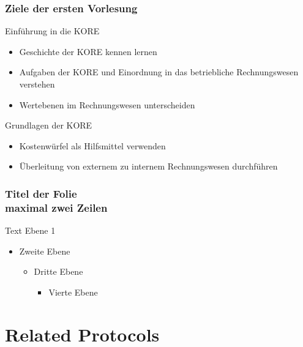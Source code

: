 \documentclass{beamer}
\begin{document}
\begin{frame}


\end{frame}



\begin{frame}
	\frametitle{Ziele der ersten Vorlesung}
	Einführung in die KORE
	\begin{itemize}
		\item Geschichte der KORE kennen lernen
		\item Aufgaben der KORE und Einordnung in das betriebliche Rechnungswesen verstehen
		\item Wertebenen im Rechnungswesen unterscheiden
	\end{itemize}
	
	Grundlagen der KORE
	\begin{itemize}
		\item Kostenwürfel als Hilfsmittel verwenden
		\item Überleitung von externem zu internem Rechnungswesen durchführen
	\end{itemize}
\end{frame}

\begin{frame}
	\frametitle{Titel der Folie\\maximal zwei Zeilen}
	Text Ebene 1
	\begin{itemize}
		\item Zweite Ebene
		\begin{itemize}
			\item Dritte Ebene
			\begin{itemize}
				\item Vierte Ebene
			\end{itemize}
		\end{itemize}
	\end{itemize}
\end{frame}

\section{Related Protocols}
\end{document}
